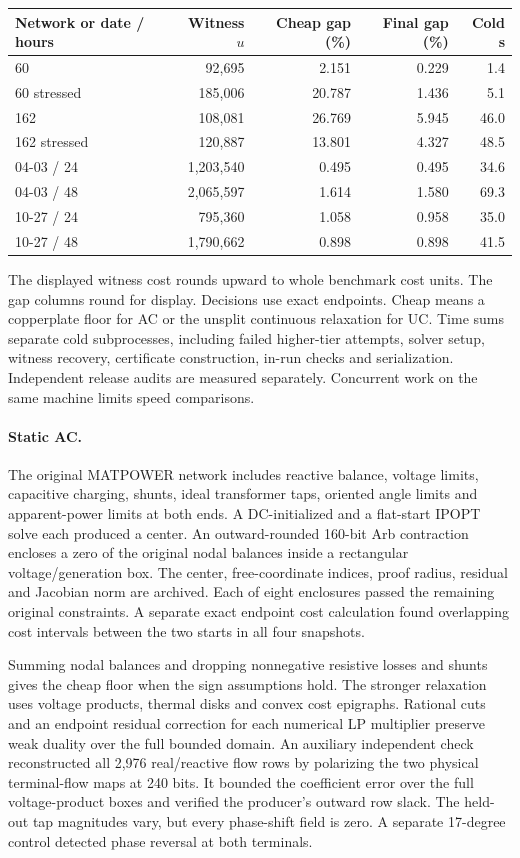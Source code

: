 \documentclass[11pt,letterpaper]{article}
\begin{document}
\begin{center}\small
\begin{tabular}{lrrrr}\toprule
Network or date / hours & Witness $u$ & Cheap gap (\%) & Final gap (\%) & Cold s\\\midrule
60 & 92,695 & 2.151 & 0.229 & 1.4\\
60 stressed & 185,006 & 20.787 & 1.436 & 5.1\\
162 & 108,081 & 26.769 & 5.945 & 46.0\\
162 stressed & 120,887 & 13.801 & 4.327 & 48.5\\
04-03 / 24 & 1,203,540 & 0.495 & 0.495 & 34.6\\
04-03 / 48 & 2,065,597 & 1.614 & 1.580 & 69.3\\
10-27 / 24 & 795,360 & 1.058 & 0.958 & 35.0\\
10-27 / 48 & 1,790,662 & 0.898 & 0.898 & 41.5\\
\bottomrule\end{tabular}
\end{center}
The displayed witness cost rounds upward to whole benchmark cost units. The gap columns round for display. Decisions use exact endpoints. Cheap means a copperplate floor for AC or the unsplit continuous relaxation for UC. Time sums separate cold subprocesses, including failed higher-tier attempts, solver setup, witness recovery, certificate construction, in-run checks and serialization. Independent release audits are measured separately. Concurrent work on the same machine limits speed comparisons.

\paragraph{Static AC.} The original MATPOWER network includes reactive balance, voltage limits, capacitive charging, shunts, ideal transformer taps, oriented angle limits and apparent-power limits at both ends. A DC-initialized and a flat-start IPOPT solve each produced a center. An outward-rounded 160-bit Arb contraction encloses a zero of the original nodal balances inside a rectangular voltage/generation box. The center, free-coordinate indices, proof radius, residual and Jacobian norm are archived. Each of eight enclosures passed the remaining original constraints. A separate exact endpoint cost calculation found overlapping cost intervals between the two starts in all four snapshots.

Summing nodal balances and dropping nonnegative resistive losses and shunts gives the cheap floor when the sign assumptions hold. The stronger relaxation uses voltage products, thermal disks and convex cost epigraphs. Rational cuts and an endpoint residual correction for each numerical LP multiplier preserve weak duality over the full bounded domain. An auxiliary independent check reconstructed all 2,976 real/reactive flow rows by polarizing the two physical terminal-flow maps at 240 bits. It bounded the coefficient error over the full voltage-product boxes and verified the producer's outward row slack. The held-out tap magnitudes vary, but every phase-shift field is zero. A separate 17-degree control detected phase reversal at both terminals.
\end{document}
